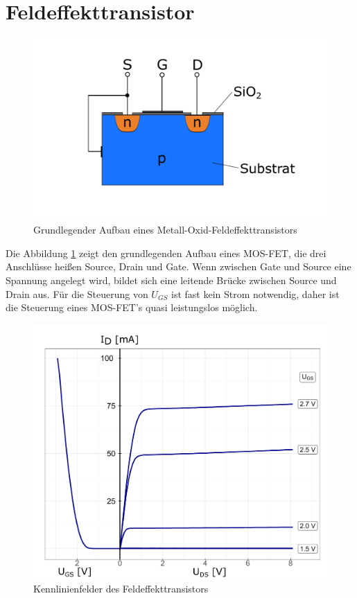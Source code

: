 \documentclass[12pt,a4paper,ngerman]{report}
\begin{document}
	\section{Feldeffekttransistor}
	\begin{figure}[h]
		\centering
		\includegraphics[width=\textwidth]{plots/MosFET.pdf}
		\caption{Grundlegender Aufbau eines Metall-Oxid-Feldeffekttransistors}
		\label{img:MosFET}
	\end{figure}	
	Die Abbildung \ref{img:MosFET} zeigt den grundlegenden Aufbau eines MOS-FET, die drei Anschlüsse heißen Source, Drain und Gate. Wenn zwischen Gate und Source eine Spannung angelegt wird, bildet sich eine leitende Brücke zwischen Source und Drain aus. Für die Steuerung von $U_{GS}$ ist fast kein Strom notwendig, daher ist die Steuerung eines MOS-FET's quasi leistungslos möglich.\\
	\begin{figure}[h]
	\centering
	\includegraphics[width=\textwidth]{plots/FET.pdf}
	\caption{Kennlinienfelder des Feldeffekttransistors}
	\label{img:FET}
	\end{figure}
\end{document}
